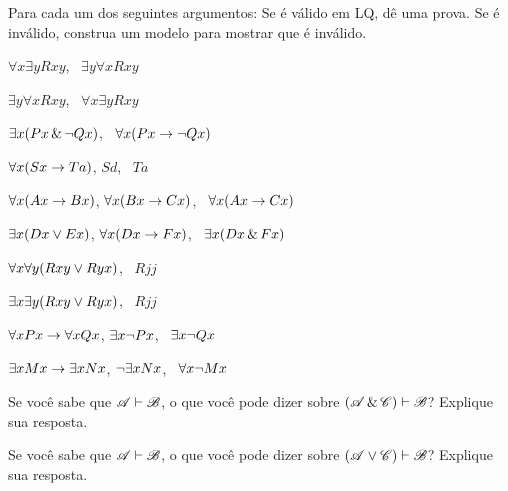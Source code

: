 \solutions
\problempart
\label{pr.QLvalidornot}
Para cada um dos seguintes argumentos: Se é válido em LQ, dê uma prova. Se é inválido, construa um modelo para mostrar que é inválido.
\begin{earg}
\item $\forall x\exists y Rxy$, \therefore\ $\exists y\forall x Rxy$
\item $\exists y\forall x Rxy$, \therefore\ $\forall x\exists y Rxy$
\item $\exists x(Px \,\&\, \neg Qx)$, \therefore\ $\forall x(Px \rightarrow \neg Qx)$
\item $\forall x(Sx \rightarrow Ta)$, $Sd$, \therefore\ $Ta$
\item $\forall x(Ax\rightarrow Bx)$, $\forall x(Bx \rightarrow Cx)$, \therefore\ $\forall x(Ax \rightarrow Cx)$
\item $\exists x(Dx \vee Ex)$, $\forall x(Dx \rightarrow Fx)$, \therefore\ $\exists x(Dx \,\&\, Fx)$
\item $\forall x\forall y(Rxy \vee Ryx)$, \therefore\ $Rjj$
\item $\exists x\exists y(Rxy \vee Ryx)$, \therefore\ $Rjj$
\item $\forall x Px \rightarrow \forall x Qx$, $\exists x \neg Px$, \therefore\ $\exists x \neg Qx$
\item $\exists x Mx \rightarrow \exists x Nx$, $\neg \exists x Nx$, \therefore\ $\forall x \neg Mx$
\end{earg}






\problempart
\begin{earg}
\item Se você sabe que $\mathscr{A}\vdash\mathscr{B}$, o que você pode dizer sobre $(\mathscr{A}\,\&\,\mathscr{C})\vdash\mathscr{B}$? Explique sua resposta.
\item Se você sabe que $\mathscr{A}\vdash\mathscr{B}$, o que você pode dizer sobre $(\mathscr{A}\vee\mathscr{C})\vdash\mathscr{B}$? Explique sua resposta.
\end{earg}
